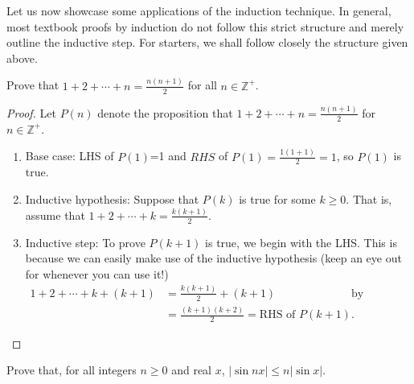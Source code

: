 \documentclass[../main.tex]{subfiles}
\begin{document}
Let us now showcase some applications of the induction technique. In general, most textbook proofs by induction do not follow this strict structure and merely outline the inductive step. For starters, we shall follow closely the structure given above.
\begin{example}[Classic]
    Prove that $1+2+\cdots+n=\frac{n(n+1)}{2}$ for all $n\in\mathbb{Z}^+$.
\end{example}
\begin{proof}
    Let $P(n)$ denote the proposition that $1+2+\cdots+n=\frac{n(n+1)}{2}$ for $n\in\mathbb{Z}^+$.

    \begin{enumerate}
        \item Base case: LHS of $P(1)$=1 and $RHS$ of $P(1)=\frac{1(1+1)}{2}=1$, so $P(1)$ is true.
        \item Inductive hypothesis: Suppose that $P(k)$ is true for some $k\geq 0$. That is, assume that $1+2+\cdots+k=\frac{k(k+1)}{2}$.
        \item Inductive step: To prove $P(k+1)$ is true, we begin with the LHS. This is because we can easily make use of the inductive hypothesis (keep an eye out for whenever you can use it!)
        \begin{align*}
            1+2+\cdots+k+(k+1) &= \frac{k(k+1)}{2}+(k+1) &\text{by inductive hypothesis} \\
            &=\frac{(k+1)(k+2)}{2} =\text{RHS of $P(k+1)$.}
        \end{align*} 
    \end{enumerate}
\end{proof}
\begin{example}[Classic]
    Prove that, for all integers $n \geq 0$ and real $x$, $|\sin{nx}|\leq n|\sin{x}|$.
\end{example}
\end{document}
